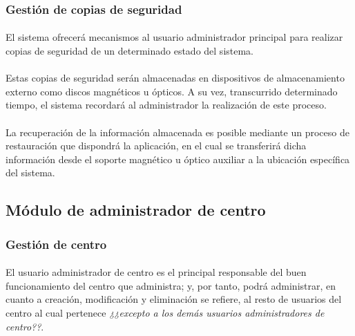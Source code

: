       \subsubsection{Gestión de copias de seguridad}

      \paragraph{}El sistema ofrecerá mecanismos al usuario administrador
      principal para realizar copias de seguridad de un determinado estado del
      sistema.

      \paragraph{}Estas copias de seguridad serán almacenadas en dispositivos
      de almacenamiento externo como discos magnéticos u ópticos. A su vez,
      transcurrido determinado tiempo, el sistema recordará al administrador
      la realización de este proceso.

      \paragraph{}La recuperación de la información almacenada es posible
      mediante un proceso de restauración que dispondrá la aplicación, en el
      cual se transferirá dicha información desde el soporte magnético u
      óptico auxiliar a la ubicación específica del sistema.

   \subsection{Módulo de administrador de centro}

      \subsubsection{Gestión de centro}

      \paragraph{}El usuario administrador de centro es el principal responsable
      del buen funcionamiento del centro que administra; y, por tanto, podrá
      administrar, en cuanto a creación, modificación y eliminación se refiere,
      al resto de usuarios del centro al cual pertenece \textit{¿¿excepto a los
      demás usuarios administradores de centro??}.

